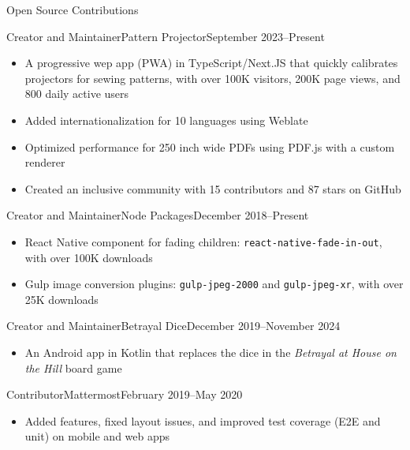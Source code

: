 \documentclass[]{mcdowellcv}
\begin{document}
	\makeheader
	
	\begin{cvsection}{Open Source Contributions}
    \begin{cvsubsection}{Creator and Maintainer}{Pattern Projector}{September 2023--Present}
      \begin{itemize}
        \item A progressive wep app (PWA) in TypeScript/Next.JS that quickly calibrates projectors for sewing patterns, with over 100K visitors, 200K page views, and 800 daily active users
        \item Added internationalization for 10 languages using Weblate
        \item Optimized performance for 250 inch wide PDFs using PDF.js with a custom renderer
        \item Created an inclusive community with 15 contributors and 87 stars on GitHub
      \end{itemize}
    \end{cvsubsection}

    \begin{cvsubsection}{Creator and Maintainer}{Node Packages}{December 2018--Present}
      \begin{itemize}
        \item React Native component for fading children: \texttt{react-native-fade-in-out}, with over 100K downloads
        \item Gulp image conversion plugins: \texttt{gulp-jpeg-2000} and \texttt{gulp-jpeg-xr}, with over 25K downloads
      \end{itemize}
    \end{cvsubsection}	
  
    \begin{cvsubsection}{Creator and Maintainer}{Betrayal Dice}{December 2019--November 2024}
      \begin{itemize}
        \item An Android app in Kotlin that replaces the dice in the \textit{Betrayal at House on the Hill} board game
      \end{itemize}
    \end{cvsubsection}
    
    \begin{cvsubsection}{Contributor}{Mattermost}{February 2019--May 2020}
      \begin{itemize}
        \item Added features, fixed layout issues, and improved test coverage (E2E and unit) on mobile and web apps
      \end{itemize}
    \end{cvsubsection}
  \end{cvsection}
\end{document}

